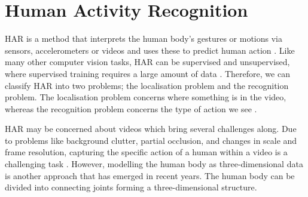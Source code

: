 \section{Human Activity Recognition}

HAR is a method that interprets the human body's gestures or motions via sensors, accelerometers or videos and uses these to predict human action \autocite{jobanputra2019human}. Like many other computer vision tasks, HAR can be supervised and unsupervised, where supervised training requires a large amount of data \autocite{ann2014human}. Therefore, we can classify HAR into two problems; the localisation problem and the recognition problem. The localisation problem concerns where something is in the video, whereas the recognition problem concerns the type of action we see \autocite{vrigkas2015review}. 

HAR may be concerned about videos which bring several challenges along. Due to problems like background clutter, partial occlusion, and changes in scale and frame resolution, capturing the specific action of a human within a video is a challenging task \autocite{vrigkas2015review}. However, modelling the human body as three-dimensional data is another approach that has emerged in recent years. The human body can be divided into connecting joints forming a three-dimensional structure.  